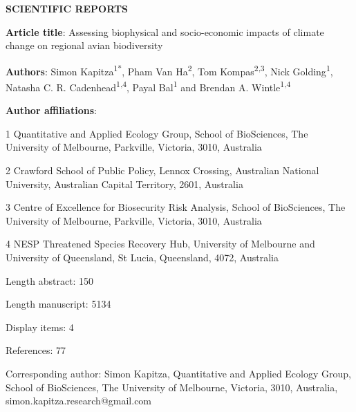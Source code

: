 \documentclass[titlesmallcaps,copyrightpage]{uomthesis}\usepackage[]{graphicx}\usepackage[]{color}
\begin{document}
{\parindent0pt
\textbf{SCIENTIFIC REPORTS}

\vspace{2cm}

\textbf{Article title}: Assessing biophysical and socio-economic impacts of climate change on regional avian biodiversity

\vspace{1cm}

\textbf{Authors}: Simon Kapitza\textsuperscript{1*}, Pham Van Ha\textsuperscript{2}, Tom Kompas\textsuperscript{2,3}, Nick Golding\textsuperscript{1}, Natasha C. R. Cadenhead\textsuperscript{1,4}, Payal Bal\textsuperscript{1} and Brendan A. Wintle\textsuperscript{1,4}

\vspace{1cm}

\textbf{Author affiliations}:

1 Quantitative and Applied Ecology Group, School of BioSciences, The University of Melbourne, Parkville, Victoria, 3010, Australia

2 Crawford School of Public Policy, Lennox Crossing, Australian National University, Australian Capital Territory, 2601, Australia

3 Centre of Excellence for Biosecurity Risk Analysis, School of BioSciences, The University of Melbourne, Parkville, Victoria, 3010, Australia

4 NESP Threatened Species Recovery Hub, University of Melbourne and University of Queensland, St Lucia, Queensland, 4072, Australia

\vspace{1cm}

Length abstract: 150

\vspace{1cm}

Length manuscript: 5134

\vspace{1cm}

Display items: 4

\vspace{1cm}

References: 77

\vspace{1cm}

Corresponding author: Simon Kapitza, Quantitative and Applied Ecology Group, School of BioSciences, The University of Melbourne, Victoria, 3010, Australia, simon.kapitza.research@gmail.com
}

\pagebreak
\end{document}
